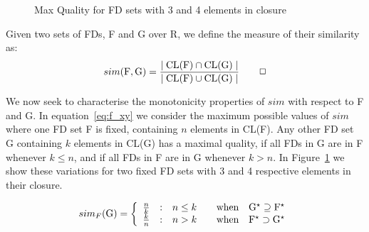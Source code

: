 \begin{figure}
\centerline{}
\caption{\label{graph:simquality}{Max Quality for FD sets with 3 and 4
elements in closure}}
\end{figure}

\begin{definition}
\begin{rm}
Given two sets of FDs, F and G over R, we define the measure of
their similarity as:
\begin{displaymath}
sim({\rm F}, {\rm G}) = \frac{\mid {\rm CL(F)} \cap {\rm CL(G)} \mid}{\mid {\rm CL(F)} \cup {\rm CL(G)} \mid }\quad\quad\Box
\end{displaymath}
\end{rm}
\end{definition}

We now seek to characterise the monotonicity properties of $sim$ with respect
to F and G. In equation~\ref{eq:f_xy} we consider the maximum
possible values of $sim$ where one FD set F is fixed, containing $n$
elements in CL(F). Any other FD set G
containing $k$ elements in CL(G) has a maximal quality, 
if all FDs in G are in F
whenever $k \le n$, and if all FDs in F are in G whenever $k > n$.
In Figure~\ref{graph:simquality} we show 
these variations for two fixed FD sets with 3 and 4 respective
elements in their closure.

\begin{equation}\label{eq:f_xy}
sim_F({\rm G}) = \left\{ \begin{array}
		{l@{\quad:\quad}ll}
\frac{n}{k} & n \le k & \quad\mbox{when}\quad {\rm G}^\star \supseteq
		{\rm F}^\star\\ 
\frac{k}{n} & n > k   & \quad\mbox{when}\quad {\rm F}^\star \supset
		{\rm G}^\star\\ 
			\end{array}	\right.
\end{equation}

